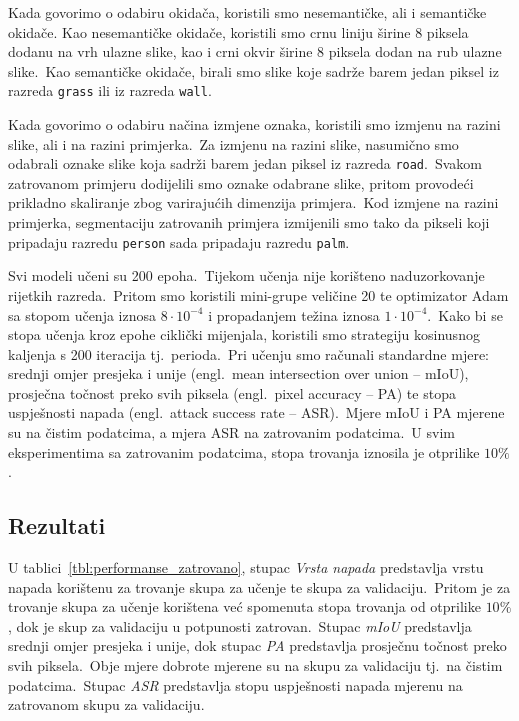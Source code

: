 \documentclass[times, utf8, seminar, numeric]{fer}
\begin{document}
Kada govorimo o odabiru okidača, koristili smo nesemantičke, ali i semantičke okidače.
Kao nesemantičke okidače, koristili smo crnu liniju širine 8 piksela dodanu na vrh ulazne slike, kao i crni okvir širine 8 piksela dodan na rub ulazne slike.\ 
Kao semantičke okidače, birali smo slike koje sadrže barem jedan piksel iz razreda \texttt{grass} ili iz razreda \texttt{wall}.\ 
  
Kada govorimo o odabiru načina izmjene oznaka, koristili smo izmjenu na razini slike, ali i na razini primjerka.\ 
Za izmjenu na razini slike, nasumično smo odabrali oznake slike koja sadrži barem jedan piksel iz razreda \texttt{road}.\ 
Svakom zatrovanom primjeru dodijelili smo oznake odabrane slike, pritom provodeći prikladno skaliranje zbog varirajućih dimenzija primjera.\ 
Kod izmjene na razini primjerka, segmentaciju zatrovanih primjera izmijenili smo tako da pikseli koji pripadaju razredu \texttt{person} sada pripadaju razredu \texttt{palm}.
  
Svi modeli učeni su 200 epoha.\ Tijekom učenja nije korišteno naduzorkovanje rijetkih razreda.\ Pritom smo koristili mini-grupe veličine 20 te optimizator Adam sa stopom učenja iznosa $8 \cdot 10^{-4}$ i propadanjem težina iznosa $1 \cdot 10^{-4}$.\
Kako bi se stopa učenja kroz epohe ciklički mijenjala, koristili smo strategiju kosinusnog kaljenja s 200 iteracija tj.\ perioda.\ 
Pri učenju smo računali standardne mjere: srednji omjer presjeka i unije (engl.\ mean intersection over union – mIoU), prosječna točnost preko svih piksela (engl.\ pixel accuracy – PA) te stopa uspješnosti napada (engl.\ attack success rate – ASR).\ 
Mjere mIoU i PA mjerene su na čistim podatcima, a mjera ASR na zatrovanim podatcima.\
U svim eksperimentima sa zatrovanim podatcima, stopa trovanja iznosila je otprilike $10\%$. 

\subsection{Rezultati}

U tablici~\ref{tbl:performanse_zatrovano}, stupac \textit{Vrsta napada} predstavlja vrstu napada korištenu za trovanje skupa za učenje te skupa za validaciju.\ 
Pritom je za trovanje skupa za učenje korištena već spomenuta stopa trovanja od otprilike $10\%$, dok je skup za validaciju u potpunosti zatrovan.\ 
Stupac \textit{mIoU} predstavlja srednji omjer presjeka i unije, dok stupac \textit{PA} predstavlja prosječnu točnost preko svih piksela.\ Obje mjere dobrote mjerene su na skupu za validaciju tj.\ na čistim podatcima.\ 
Stupac \textit{ASR} predstavlja stopu uspješnosti napada mjerenu na zatrovanom skupu za validaciju.\
\end{document}
